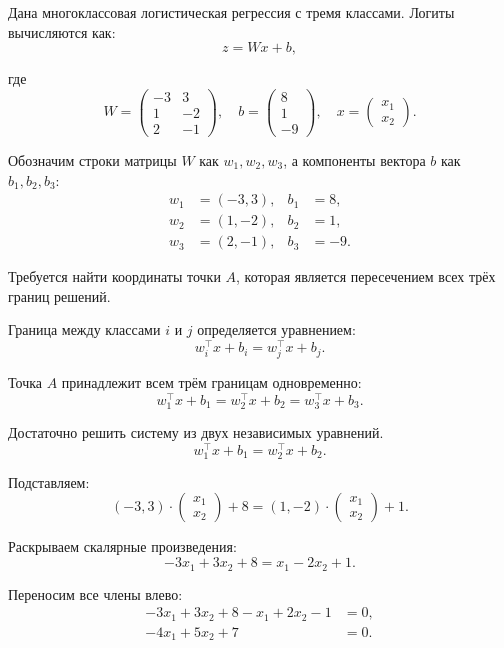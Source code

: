 \documentclass[pract]{SCWorks}
\begin{document}
    Дана многоклассовая логистическая регрессия с тремя классами. Логиты вычисляются как:
    \[
    z = Wx + b,
    \]

    где
    \[
    W = \begin{pmatrix}
    -3 & 3 \\
    1 & -2 \\
    2 & -1
    \end{pmatrix}, \quad
    b = \begin{pmatrix}
    8 \\ 1 \\ -9
    \end{pmatrix}, \quad
    x = \begin{pmatrix}
    x_1 \\ x_2
    \end{pmatrix}.
    \]

    Обозначим строки матрицы $W$ как $w_1, w_2, w_3$, а компоненты вектора $b$ как $b_1, b_2, b_3$:
    \[
    \begin{aligned}
    w_1 &= (-3, 3), & b_1 &= 8, \\
    w_2 &= (1, -2), & b_2 &= 1, \\
    w_3 &= (2, -1), & b_3 &= -9.
    \end{aligned}
    \]

    Требуется найти координаты точки $A$, которая является пересечением всех трёх границ решений.

    Граница между классами $i$ и $j$ определяется уравнением:
    \[
    w_i^\top x + b_i = w_j^\top x + b_j.
    \]

    Точка $A$ принадлежит всем трём границам одновременно:
    \[
    w_1^\top x + b_1 = w_2^\top x + b_2 = w_3^\top x + b_3.
    \]

    Достаточно решить систему из двух независимых уравнений.
    \[
    w_1^\top x + b_1 = w_2^\top x + b_2.
    \]

    Подставляем:
    \[
    (-3, 3) \cdot \begin{pmatrix} x_1 \\ x_2 \end{pmatrix} + 8 = (1, -2) \cdot \begin{pmatrix} x_1 \\ x_2 \end{pmatrix} + 1.
    \]

    Раскрываем скалярные произведения:
    \[
    -3x_1 + 3x_2 + 8 = x_1 - 2x_2 + 1.
    \]

    Переносим все члены влево:
    \[
    \begin{aligned}
    -3x_1 + 3x_2 + 8 - x_1 + 2x_2 - 1 &= 0, \\
    -4x_1 + 5x_2 + 7 &= 0.
    \end{aligned}
    \]
\end{document}
